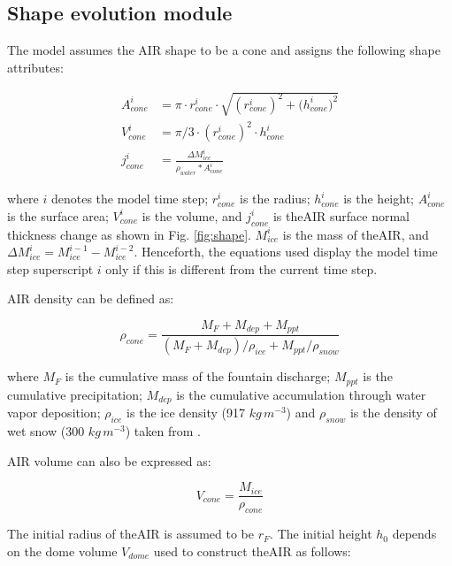 \subsection{Shape evolution module} \label{sec:shape}

The model assumes the \ac{AIR} shape to be a cone and assigns the following shape attributes:

\begin{subequations}
	\begin{align}
		\label{eq:A}
		A_{cone}^i & = \pi \cdot r_{cone}^i \cdot \sqrt{{(r_{cone}^i)}^2 + {(h_{cone}^i})^ 2} \\
		\label{eq:V}
		V_{cone}^i & = \pi/3 \cdot {(r_{cone}^i)}^2 \cdot h_{cone}^i                          \\
		\label{eq:thickness}
		j_{cone}^i & =\frac{\Delta M_{ice}^i}{\rho_{water}* A_{cone}^i}
	\end{align}
\end{subequations}

where $i$ denotes the model time step; $r_{cone}^i$ is the radius; $h_{cone}^i$ is the height; $A_{cone}^i$ is
the surface area; $V_{cone}^i$ is the volume, and $j_{cone}^i$ is the\ac{AIR} surface normal thickness change as shown
in Fig. \ref{fig:shape}. $M_{ice}^i$ is the mass of the\ac{AIR}, and $\Delta M_{ice}^i = M_{ice}^{i-1} -
	M_{ice}^{i-2}$. Henceforth, the equations used display the model time step superscript $i$ only if this is different
from the current time step.

AIR density can be defined as:

\begin{equation}
	\rho_{cone} = \frac{M_{F} + M_{dep} + M_{ppt}}{(M_{F} + M_{dep})/\rho_{ice} + M_{ppt}/\rho_{snow}}
\end{equation}

where $M_F$ is the cumulative mass of the fountain discharge; $M_{ppt}$ is the cumulative precipitation;
$M_{dep}$ is the cumulative accumulation through water vapor deposition; $\rho_{ice}$ is the ice density (917
$kg\,m^{-3}$) and $\rho_{snow}$ is the density of wet snow (300 $kg\,m^{-3}$) taken from
\cite{cuffeyPhysicsGlaciers2010}.

AIR volume can also be expressed as:

\begin{equation} V_{cone} =\frac{M_{ice}} {\rho_{cone}} \label{eq:V1} \end{equation}

The initial radius of the\ac{AIR} is assumed to be $r_F$. The initial height $h_0$ depends on the dome volume
$V_{dome}$ used to construct the\ac{AIR} as follows:

